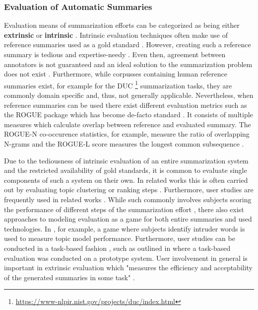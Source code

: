\subsubsection{Evaluation of Automatic Summaries}
\label{eval}
Evaluation means of summarization efforts can be categorized as being either \textbf{extrinsic} or \textbf{intrinsic} \cite{Hassel04lic}.
Intrinsic evaluation techniques often make use of reference summaries used as a gold standard \cite{Hassel04lic}. However, creating such a reference summary is tedious and expertise-needy \cite{DBLP:conf/coling/ZopfPE16}. Even then, agreement between annotators is not guaranteed \cite{Das07asurvey} and an ideal solution to the summarization problem does not exist \cite{Das07asurvey}. Furthermore, while corpusses containing human reference summaries exist, for example for the DUC \footnote{\url{https://www-nlpir.nist.gov/projects/duc/index.html}} summarization tasks, they are commonly domain specific and, thus, not generally applicable. Nevertheless, when reference summaries can be used there exist different evaluation metrics such as the ROGUE \cite{Lin:2004} package which has become de-facto standard \cite{Das07asurvey}.
It consists of multiple measures which calculate overlap between reference and evaluated summary. The ROGUE-N co-occurence statistics, for example, measure the ratio of overlapping N-grams and the ROGUE-L score measures the longest common subsequence \cite{Lin:2004}. 
\par
Due to the tediousness of intrinsic evaluation of an entire summarization system and the restricted availability of gold standards, it is common to evaluate single components of such a system on their own. In related works this is often carried out by evaluating topic clustering \cite{DBLP:conf/cikm/MaSYC12, llewellyn_grover_oberlander, DBLP:conf/icwsm/KhabiriCH11, DBLP:conf/ecir/AkerKBPBHG16} or ranking steps \cite{llewellyn_grover_oberlander, DBLP:conf/icwsm/KhabiriCH11}. Furthermore, user studies are frequently used in related works \cite{DBLP:conf/cikm/MaSYC12, llewellyn_grover_oberlander, DBLP:conf/icwsm/KhabiriCH11}.
While such commonly involves subjects scoring the performance of different steps of the summarization effort \cite{DBLP:conf/cikm/MaSYC12, llewellyn_grover_oberlander, DBLP:conf/icwsm/KhabiriCH11, DBLP:conf/ecir/AkerKBPBHG16}, there also exist approaches to modeling evaluation as a game for both entire summaries \cite{Hassel04lic} and used technologies. In \cite{DBLP:phd/dnb/Kling16, NIPS2009_3700}, for example, a game where subjects identify intruder words is used to measure topic model performance.
Furthermore, user studies can be conducted in a task-based fashion \cite{DBLP:journals/corr/cs-CL-0005020}, such as outlined in \cite{DBLP:conf/lrec/BarkerPFKAFHG16} where a task-based evaluation was conducted on a prototype system.
User involvement in general is important in extrinsic evaluation which "measures the efficiency and acceptability of the generated summaries in some task" \cite{Hassel04lic}.

